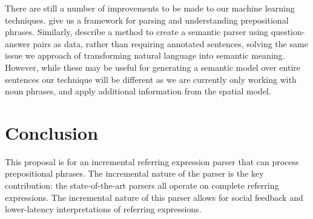\documentclass[letterpaper,10pt]{article}
\begin{document}
There are still a number of improvements to be made to our machine learning techniques. \citet{rudzicz03} give us a framework for parsing and understanding prepositional phrases. Similarly, \citet{liang2013learning} describe a method to create a semantic parser using question-answer pairs as data, rather than requiring annotated sentences, solving the same issue we approach of transforming natural language into semantic meaning. However, while these may be useful for generating a semantic model over entire sentences our technique will be different as we are currently only working with noun phrases, and apply additional information from the spatial model. 

\section{Conclusion}
This proposal is for an incremental referring expression parser that can process prepositional phrases. The incremental nature of the parser is the key contribution: the state-of-the-art parsers all operate on complete referring expressions. The incremental nature of this parser allows for social feedback and lower-latency interpretations of referring expressions.

\clearpage
\printbibliography
\end{document}
